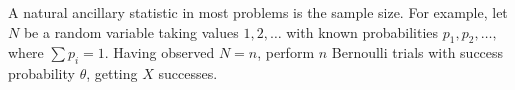 \documentclass[12pt,letterpaper]{exam}
\begin{document}
\begin{questions}

	\begin{solution}
		\begin{parts}
			\part
			\part
			\part
			\part
			\part
		\end{parts}
	\end{solution}
	
	\setcounter{question}{11}
	\question 
	A natural ancillary statistic in most problems is the sample size. 
	For example, let \(N\) be a random variable taking values \(1, 2,\ldots\) 
	with known probabilities \(p_1, p_2, \ldots,\) where \(\sum p_i=1\).
	Having observed \(N = n\), perform \(n\) Bernoulli trials with success probability
	\(\theta\), getting \(X\) successes.
\end{questions}
\end{document}
